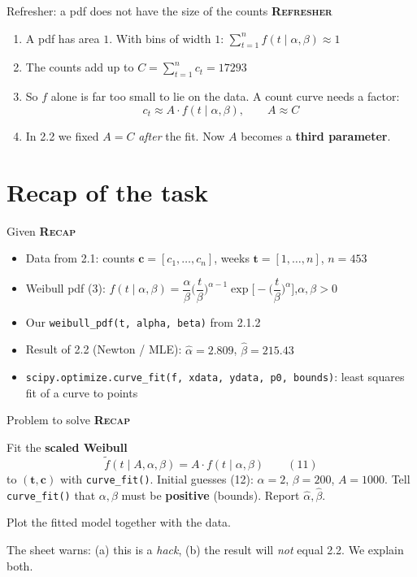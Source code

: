 \documentclass[aspectratio=169,11pt]{beamer}
\newcommand{\stage}[2]{{\color{#1}\bfseries\small\textsc{#2}}\par\smallskip}
\newcommand{\Given}{\stage{given}{Recap}}
\newcommand{\Refresh}{\stage{given}{Refresher}}
\begin{document}
\begin{frame}{Refresher: a pdf does not have the size of the counts}
\Refresh
\begin{enumerate}
\item A pdf has area $1$. With bins of width $1$: \quad $\sum_{t=1}^n f(t\mid\alpha,\beta)\approx1$
\item The counts add up to \quad $C=\sum_{t=1}^n c_t=17293$
\item So $f$ alone is far too small to lie on the data. A count curve needs a factor:
\[c_t\approx A\cdot f(t\mid\alpha,\beta),\qquad A\approx C\]
\item In 2.2 we fixed $A=C$ \emph{after} the fit. Now $A$ becomes a \textbf{third parameter}.
\end{enumerate}
\end{frame}

\section{Recap of the task}

\begin{frame}{Given}
\Given
\begin{itemize}
\item Data from 2.1: counts $\bm c=[c_1,\dots,c_n]$, weeks $\bm t=[1,\dots,n]$, $n=453$
\item Weibull pdf (3):\quad
$f(t\mid\alpha,\beta)=\dfrac{\alpha}{\beta}\Big(\dfrac t\beta\Big)^{\alpha-1}\exp\!\Big[-\Big(\dfrac t\beta\Big)^{\alpha}\Big]$,\quad $\alpha,\beta>0$
\item Our \texttt{weibull\_pdf(t, alpha, beta)} from 2.1.2
\item Result of 2.2 (Newton / MLE): $\hat\alpha=2.809$, $\hat\beta=215.43$
\item \texttt{scipy.optimize.curve\_fit(f, xdata, ydata, p0, bounds)}: least squares fit of a curve to points
\end{itemize}
\end{frame}

\begin{frame}{Problem to solve}\small
\Given
\begin{description}[Task 2.3.2]
\item[Task 2.3.1] Fit the \textbf{scaled Weibull}
\[\tilde f(t\mid A,\alpha,\beta)=A\cdot f(t\mid\alpha,\beta)\qquad(11)\]
to $(\bm t,\bm c)$ with \texttt{curve\_fit()}. Initial guesses (12): $\alpha=2$, $\beta=200$, $A=1000$.
Tell \texttt{curve\_fit()} that $\alpha,\beta$ must be \textbf{positive} (bounds). Report $\hat\alpha,\hat\beta$.
\item[Task 2.3.2] Plot the fitted model together with the data.
\end{description}
\medskip
The sheet warns: (a) this is a \emph{hack}, (b) the result will \emph{not} equal 2.2. We explain both.
\end{frame}
\end{document}
